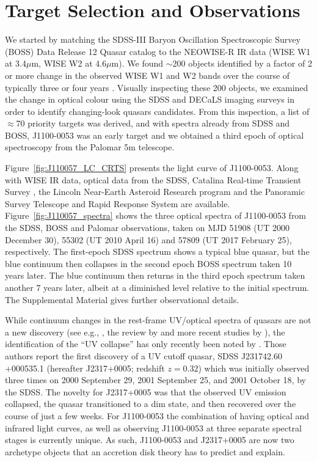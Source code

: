 \documentclass{nature}
\begin{document}
\section{Target Selection and Observations}  
We started by matching the SDSS-III Baryon Oscillation Spectroscopic
Survey (BOSS) Data Release 12 Quasar catalog \cite[DR12Q;
][]{Paris2017} to the NEOWISE-R IR data (WISE W1 at 3.4$\mu$m, WISE W2
at 4.6$\mu$m). We found $\sim$200 objects identified by a factor of 2
or more change in the observed WISE W1 and W2 bands over the course of
typically three or four years \citep[see][and the Supplemental
Material for the detailed NEOWISE-R selection]{Meisner2017b}. Visually
inspecting these 200 objects, we examined the change in optical colour
using the SDSS and DECaLS imaging surveys in order to identify
changing-look quasars candidates.  From this inspection, a list of
$\approx$70 priority targets was derived, and with spectra already
from SDSS and BOSS, J1100-0053 was an early target and we obtained a
third epoch of optical spectroscopy from the Palomar 5m telescope.

Figure~\ref{fig:J110057_LC_CRTS} presents the light curve of
J1100-0053.  Along with WISE IR data, optical data from the SDSS,
Catalina Real-time Transient Survey \citep[CRTS;][]{Drake2009,
Mahabal2011}, the Lincoln Near-Earth Asteroid Research \citep[LINEAR;
][]{Sesar2011} program and the Panoramic Survey Telescope and Rapid
Response System \citep[PanSTARRS;][]{Kaiser2010, Stubbs2010,
Tonry2012, Magnier2013} are
available. Figure~\ref{fig:J110057_spectra} shows the three optical
spectra of J1100-0053 from the SDSS, BOSS and Palomar observations,
taken on MJD 51908 (UT 2000 December 30), 55302 (UT 2010 April 16) and
57809 (UT 2017 February 25), respectively.  The first-epoch SDSS
spectrum shows a typical blue quasar, but the blue continuum then
collapses in the second epoch BOSS spectrum taken 10 years later. The
blue continuum then returns in the third epoch spectrum taken another
7 years later, albeit at a diminished level relative to the initial
spectrum. The Supplemental Material gives further observational
details.

While continuum changes in the rest-frame UV/optical spectra of
quasars are not a new discovery (see e.g., \cite{Clavel1991}, the
review by \cite{Ulrich1997} and more recent studies by
\cite{VandenBerk2004, Pereyra2006, MacLeod2010, Guo2016b}), the
identification of the ``UV collapse'' has only recently been noted by
\cite{Guo2016}.  Those authors report the first discovery of a UV
cutoff quasar, SDSS J231742.60 +000535.1 (hereafter J2317+0005;
redshift $z = 0.32$) which was initially observed three times on 2000
September 29, 2001 September 25, and 2001 October 18, by the SDSS. The
novelty for J2317+0005 was that the observed UV emission collapsed,
the quasar transitioned to a dim state, and then recovered over the
course of just a few weeks. For J1100-0053 the combination of having
optical and infrared light curves, as well as observing J1100-0053 at
three separate spectral stages is currently unique. As such,
J1100-0053 and J2317+0005 are now two archetype objects that an
accretion disk theory has to predict and explain.
\end{document}
